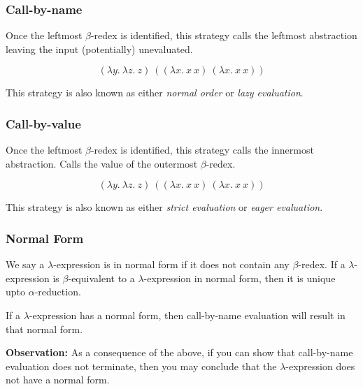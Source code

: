 \documentclass{beamer}
\begin{document}
\begin{frame}
	\frametitle{Call-by-name}

	Once the leftmost $\beta$-redex is identified, this strategy calls the leftmost abstraction leaving the input (potentially) unevaluated.

	$$(\lambda y. \ \lambda z. \ z) \ ((\lambda x. \ x \ x) \ (\lambda x. \ x \ x))$$

	\vspace{4.5cm}
	
	This strategy is also known as either \emph{normal order} or \emph{lazy evaluation}.

\end{frame}

\begin{frame}
	\frametitle{Call-by-value}

	Once the leftmost $\beta$-redex is identified, this strategy calls the innermost abstraction. Calls the value of the outermost $\beta$-redex. 

	$$(\lambda y. \ \lambda z. \ z) \ ((\lambda x. \ x \ x) \ (\lambda x. \ x \ x))$$

	\vspace{4.5cm}
	
	This strategy is also known as either \emph{strict evaluation} or \emph{eager evaluation}.

\end{frame}

\begin{frame}
	\frametitle{Normal Form}

	We say a $\lambda$-expression is in normal form if it does not contain any $\beta$-redex. If a $\lambda$-expression is $\beta$-equivalent to a $\lambda$-expression in normal form, then it is unique upto $\alpha$-reduction. 

	\vspace{0.5cm}

	If a $\lambda$-expression has a normal form, then call-by-name evaluation will result in that normal form. 

	\vspace{0.5cm}

	{\bf Observation:} As a consequence of the above, if you can show that call-by-name evaluation does not terminate, then you may conclude that the $\lambda$-expression does not have a normal form. 

	\vspace{3cm}

\end{frame}
\end{document}
